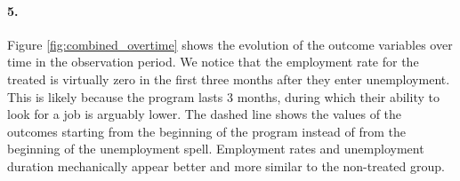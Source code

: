 \documentclass{scrartcl}
\begin{document}
\paragraph*{5.}

Figure \ref{fig:combined_overtime} shows the evolution of the outcome variables over time in the observation period. We notice that the employment rate for the treated is virtually zero in the first three months after they enter unemployment. This is likely because the program lasts 3 months, during which their ability to look for a job is arguably lower. The dashed line shows the values of the outcomes starting from the beginning of the program instead of from the beginning of the unemployment spell. Employment rates and unemployment duration mechanically appear better and more similar to the non-treated group.
\end{document}

